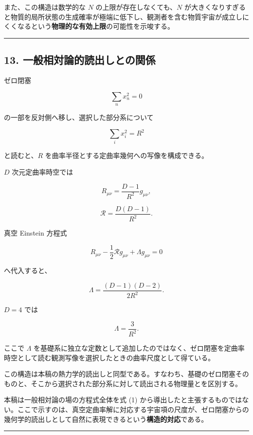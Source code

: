 \documentclass[
  a4paper,
]{ltjsarticle}
\begin{document}
また、この構造は数学的な \(N\) の上限が存在しなくても、\(N\)
が大きくなりすぎると物質的局所状態の生成確率が極端に低下し、観測者を含む物質宇宙が成立しにくくなるという\textbf{物理的な有効上限}の可能性を示唆する。

\begin{center}\rule{0.5\linewidth}{0.5pt}\end{center}

\subsection{13.
一般相対論的読出しとの関係}\label{ux4e00ux822cux76f8ux5bfeux8ad6ux7684ux8aadux51faux3057ux3068ux306eux95a2ux4fc2}

ゼロ閉塞

\[
\sum_nx_n^2=0
\]

の一部を反対側へ移し、選択した部分系について

\[
\sum_i x_i^2=R^2
\]

と読むと、\(R\) を曲率半径とする定曲率幾何への写像を構成できる。

\(D\) 次元定曲率時空では

\[
R_{\mu\nu}
=
\frac{D-1}{R^2}g_{\mu\nu},
\]

\[
\mathcal{R}
=
\frac{D(D-1)}{R^2}.
\]

真空 Einstein 方程式

\[
R_{\mu\nu}
-\frac{1}{2}\mathcal{R}g_{\mu\nu}
+\Lambda g_{\mu\nu}
=
0
\]

へ代入すると、

\[
\Lambda
=
\frac{(D-1)(D-2)}{2R^2}.
\tag{25}
\]

\(D=4\) では

\[
\Lambda
=
\frac{3}{R^2}.
\tag{26}
\]

ここで \(\Lambda\)
を基礎系に独立な定数として追加したのではなく、ゼロ閉塞を定曲率時空として読む観測写像を選択したときの曲率尺度として得ている。

この構造は本稿の熱力学的読出しと同型である。すなわち、基礎のゼロ閉塞そのものと、そこから選択された部分系に対して読出される物理量とを区別する。

本稿は一般相対論の場の方程式全体を式 (1)
から導出したと主張するものではない。ここで示すのは、真空定曲率解に対応する宇宙項の尺度が、ゼロ閉塞からの幾何学的読出しとして自然に表現できるという\textbf{構造的対応}である。

\begin{center}\rule{0.5\linewidth}{0.5pt}\end{center}
\end{document}
